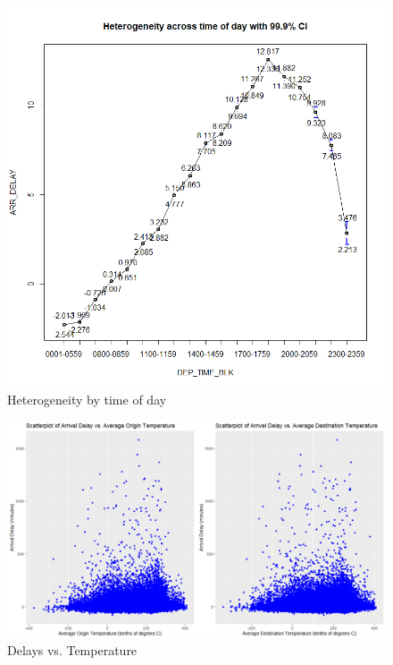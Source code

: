 \documentclass[12pt, a4paper, openany]{book}
\begin{document}
			\begin{figure}[h]
			\centering
			\includegraphics[width = 1 \textwidth]{../figures/heterogeneity_timeofday}
			\caption{Heterogeneity by time of day}
			\end{figure}


			\begin{figure}[h]
			\centering
	 		\includegraphics[width =1 \textwidth]{../figures/PLOTS FOR REPORT/Chapter 4/Figure 4.41}
	 		\caption{Delays vs. Temperature}
	 		\end{figure}
\end{document}
